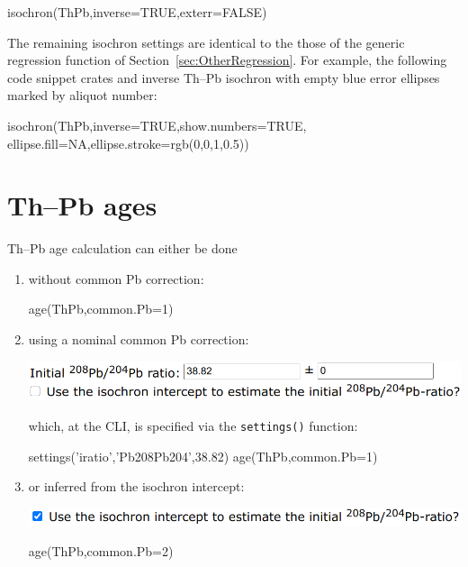 \begin{refsection}
\begin{console}
isochron(ThPb,inverse=TRUE,exterr=FALSE)
\end{console}

The remaining isochron settings are identical to the those of the
generic regression function of Section~\ref{sec:OtherRegression}. For
example, the following code snippet crates and inverse Th--Pb isochron
with empty blue error ellipses marked by aliquot number:

\begin{script}
isochron(ThPb,inverse=TRUE,show.numbers=TRUE,
         ellipse.fill=NA,ellipse.stroke=rgb(0,0,1,0.5))
\end{script}

\section{Th--Pb ages}\label{sec:ThPbAges}

Th--Pb age calculation can either be done

\begin{enumerate}

\item without common Pb correction:

\begin{console}
age(ThPb,common.Pb=1)
\end{console}

\item using a nominal common Pb correction:

\noindent\includegraphics[width=.75\linewidth]{../figures/ThPbAgePb0.png}

\noindent which, at the CLI, is specified via the \texttt{settings()} function:

\begin{script}
settings('iratio','Pb208Pb204',38.82)
age(ThPb,common.Pb=1)
\end{script}

\item or inferred from the isochron intercept:

\noindent\includegraphics[width=.75\linewidth]{../figures/ThPbAgei2i.png}

\begin{console}
age(ThPb,common.Pb=2)
\end{console}


\end{enumerate}
\end{refsection}
